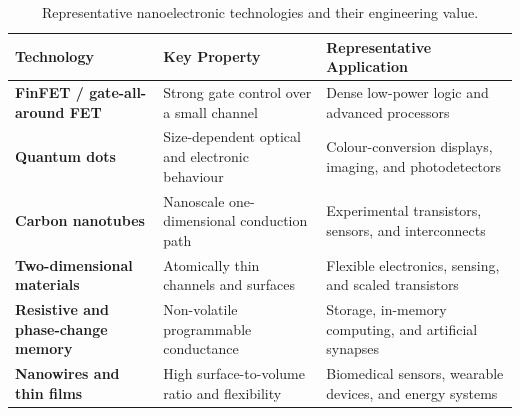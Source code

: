 \begin{table}[b]
\centering
\caption{Representative nanoelectronic technologies and their engineering value.}
\footnotesize
  \setlength{\tabcolsep}{4pt}
  \renewcommand{\arraystretch}{1.35}
  \begin{tabular}{@{}>{\bfseries\RaggedRight\arraybackslash}p{}
                      >{\RaggedRight\arraybackslash}p{}
                      >{\RaggedRight\arraybackslash}p{}@{}}
    \toprule
    \textbf{Technology} & \textbf{Key Property} & \textbf{Representative Application} \\
    \midrule
    FinFET / gate-all-around FET & Strong gate control over a small channel & Dense low-power logic and advanced processors \\
    Quantum dots & Size-dependent optical and electronic behaviour & Colour-conversion displays, imaging, and photodetectors \\
    Carbon nanotubes & Nanoscale one-dimensional conduction path & Experimental transistors, sensors, and interconnects \\
    Two-dimensional materials & Atomically thin channels and surfaces & Flexible electronics, sensing, and scaled transistors \\
    Resistive and phase-change memory & Non-volatile programmable conductance & Storage, in-memory computing, and artificial synapses \\
    Nanowires and thin films & High surface-to-volume ratio and flexibility & Biomedical sensors, wearable devices, and energy systems \\
  \bottomrule
  \end{tabular}
\end{table}
\vspace{-0.18em}

